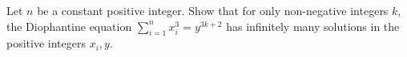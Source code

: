 Let $n$ be a constant positive integer. Show that for only non-negative integers $k$,  the Diophantine equation $\sum_{i=1 }^{n}{ x_i ^3}=y^{3k+2}$ has infinitely many solutions in the positive integers $x_i, y$.